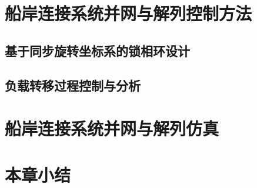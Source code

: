 \section{船岸连接系统并网与解列控制方法}

\subsection{基于同步旋转坐标系的锁相环设计}

\subsection{负载转移过程控制与分析}

\begin{table}[!htp]
	\centering
	\caption[电压和频率波动表]{电压和频率波动表\cite{SP7}}
	\label{tab:电压和频率波动表}
\end{table}

\section{船岸连接系统并网与解列仿真}




\section{本章小结}




